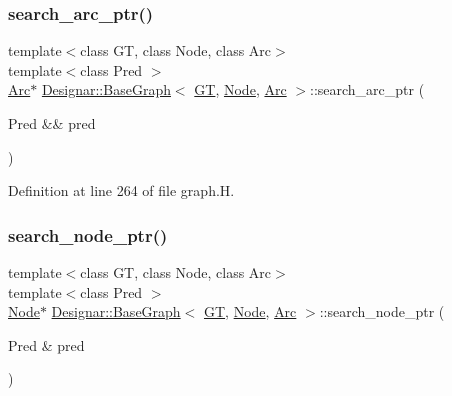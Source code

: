 \subsubsection{\texorpdfstring{search\+\_\+arc\+\_\+ptr()}{search\_arc\_ptr()}\hspace{0.1cm}{\footnotesize\ttfamily [2/2]}}
{\footnotesize\ttfamily template$<$class GT, class Node, class Arc$>$ \\
template$<$class Pred $>$ \\
\hyperlink{namespace_designar_a3f55fb5513d62ff47cbc8f72b8e95d6f}{Arc}$\ast$ \hyperlink{class_designar_1_1_base_graph}{Designar\+::\+Base\+Graph}$<$ \hyperlink{demo-buildgraph_8_c_a3001c40d2c31ca87ed96cd7d1334a55e}{GT}, \hyperlink{namespace_designar_a5af326c65aa2bd26b26c410f2030d09e}{Node}, \hyperlink{namespace_designar_a3f55fb5513d62ff47cbc8f72b8e95d6f}{Arc} $>$\+::search\+\_\+arc\+\_\+ptr (\begin{DoxyParamCaption}\item[{Pred \&\&}]{pred }\end{DoxyParamCaption})\hspace{0.3cm}{\ttfamily [inline]}}



Definition at line 264 of file graph.\+H.

\mbox{\label{class_designar_1_1_base_graph_a0bbbf3b9188013698462e015f37f6b2d}} 
\subsubsection{\texorpdfstring{search\+\_\+node\+\_\+ptr()}{search\_node\_ptr()}\hspace{0.1cm}{\footnotesize\ttfamily [1/2]}}
{\footnotesize\ttfamily template$<$class GT, class Node, class Arc$>$ \\
template$<$class Pred $>$ \\
\hyperlink{namespace_designar_a5af326c65aa2bd26b26c410f2030d09e}{Node}$\ast$ \hyperlink{class_designar_1_1_base_graph}{Designar\+::\+Base\+Graph}$<$ \hyperlink{demo-buildgraph_8_c_a3001c40d2c31ca87ed96cd7d1334a55e}{GT}, \hyperlink{namespace_designar_a5af326c65aa2bd26b26c410f2030d09e}{Node}, \hyperlink{namespace_designar_a3f55fb5513d62ff47cbc8f72b8e95d6f}{Arc} $>$\+::search\+\_\+node\+\_\+ptr (\begin{DoxyParamCaption}\item[{Pred \&}]{pred }\end{DoxyParamCaption})\hspace{0.3cm}{\ttfamily [inline]}}



